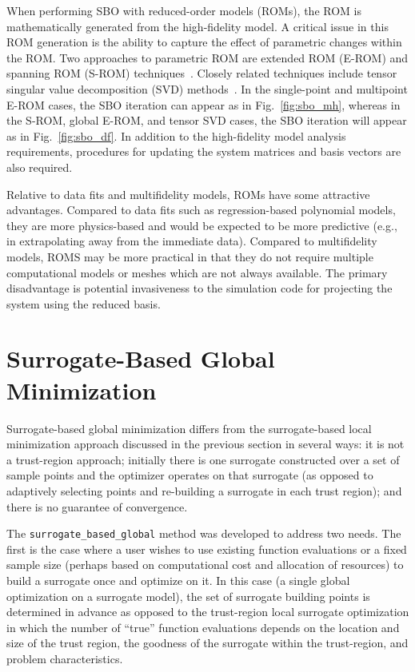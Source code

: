 When performing SBO with reduced-order models (ROMs), the ROM is
mathematically generated from the high-fidelity model.  A critical
issue in this ROM generation is the ability to capture the effect of
parametric changes within the ROM.  Two approaches to parametric ROM
are extended ROM (E-ROM) and spanning ROM (S-ROM)
techniques~\cite{Wei06}.  Closely related techniques include tensor
singular value decomposition (SVD) methods~\cite{Lat00}.  In the
single-point and multipoint E-ROM cases, the SBO iteration can appear
as in Fig.~\ref{fig:sbo_mh}, whereas in the S-ROM, global E-ROM, and
tensor SVD cases, the SBO iteration will appear as in
Fig.~\ref{fig:sbo_df}.  In addition to the high-fidelity model
analysis requirements, procedures for updating the system matrices and
basis vectors are also required.

Relative to data fits and multifidelity models, ROMs have some
attractive advantages.  Compared to data fits such as regression-based
polynomial models, they are more physics-based and would be expected
to be more predictive (e.g., in extrapolating away from the immediate
data).  Compared to multifidelity models, ROMS may be more practical
in that they do not require multiple computational models or meshes
which are not always available.  The primary disadvantage is potential
invasiveness to the simulation code for projecting the system using
the reduced basis.


\section{Surrogate-Based Global Minimization}\label{sbm:sbgm}

Surrogate-based global minimization differs from the surrogate-based 
local minimization approach discussed in the previous section in several ways: 
it is not a trust-region approach; initially there is one surrogate 
constructed over a set of sample points and the optimizer operates on that 
surrogate (as opposed to adaptively selecting points and re-building a 
surrogate in each trust region); and there is no guarantee of convergence. 

The \texttt{surrogate\_based\_global} method was developed to address
two needs.  The first is the case where a user wishes to use existing
function evaluations or a fixed sample size (perhaps based on
computational cost and allocation of resources) to build a surrogate
once and optimize on it.  In this case (a single global optimization
on a surrogate model), the set of surrogate building points is
determined in advance as opposed to the trust-region local surrogate
optimization in which the number of ``true'' function evaluations
depends on the location and size of the trust region, the goodness of
the surrogate within the trust-region, and problem characteristics.

